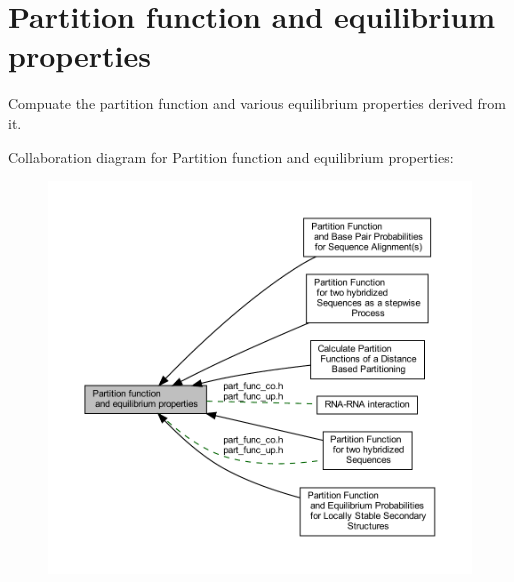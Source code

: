 \hypertarget{group__pf__fold}{}\section{Partition function and equilibrium properties}
\label{group__pf__fold}


Compuate the partition function and various equilibrium properties derived from it.  


Collaboration diagram for Partition function and equilibrium properties\+:
\nopagebreak
\begin{figure}[H]
\begin{center}
\leavevmode
\includegraphics[width=350pt]{group__pf__fold}
\end{center}
\end{figure}
